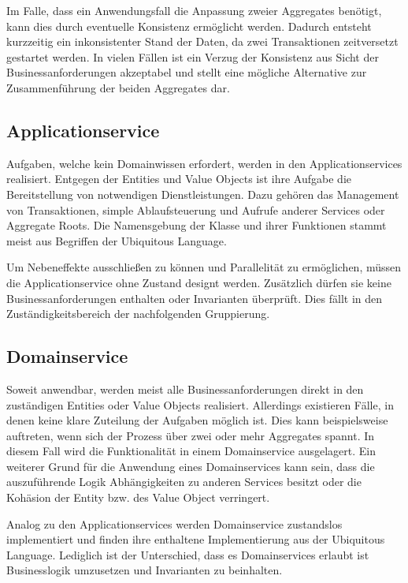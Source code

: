 Im Falle, dass ein Anwendungsfall die Anpassung zweier Aggregates benötigt, kann dies durch eventuelle Konsistenz ermöglicht werden. Dadurch entsteht kurzzeitig ein inkonsistenter Stand der Daten, da zwei Transaktionen zeitversetzt gestartet werden. In vielen Fällen ist ein Verzug der Konsistenz aus Sicht der Businessanforderungen akzeptabel und stellt eine mögliche Alternative zur Zusammenführung der beiden Aggregates dar.


\subsection{Applicationservice}

Aufgaben, welche kein Domainwissen erfordert, werden in den Applicationservices realisiert. Entgegen der Entities und Value Objects ist ihre Aufgabe die Bereitstellung von notwendigen Dienstleistungen. Dazu gehören das Management von Transaktionen, simple Ablaufsteuerung und Aufrufe anderer Services oder Aggregate Roots. Die Namensgebung der Klasse und ihrer Funktionen stammt meist aus Begriffen der Ubiquitous Language.

Um Nebeneffekte ausschließen zu können und Parallelität zu ermöglichen, müssen die Applicationservice ohne Zustand designt werden. Zusätzlich dürfen sie keine Businessanforderungen enthalten oder Invarianten überprüft. Dies fällt in den Zuständigkeitsbereich der nachfolgenden Gruppierung.

\subsection{Domainservice}

Soweit anwendbar, werden meist alle Businessanforderungen direkt in den  zuständigen Entities oder Value Objects realisiert. Allerdings existieren Fälle, in denen keine klare Zuteilung der Aufgaben möglich ist. Dies kann beispielsweise auftreten, wenn sich der Prozess über zwei oder mehr Aggregates spannt. In diesem Fall wird die Funktionalität in einem Domainservice ausgelagert. Ein weiterer Grund für die Anwendung eines Domainservices kann sein, dass die auszuführende Logik Abhängigkeiten zu anderen Services besitzt oder die Kohäsion der Entity bzw. des Value Object verringert. 

Analog zu den Applicationservices werden Domainservice zustandslos implementiert und finden ihre enthaltene Implementierung aus der Ubiquitous Language. Lediglich ist der Unterschied, dass es Domainservices erlaubt ist Businesslogik umzusetzen und Invarianten zu beinhalten.

